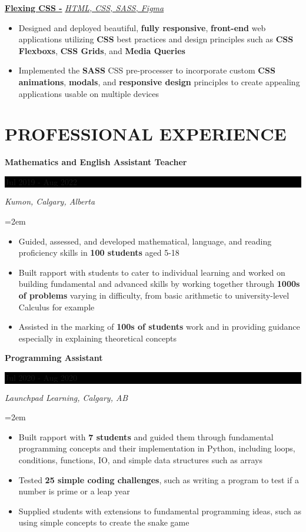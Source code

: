 \documentclass[10pt]{article}
\newcommand{\NewPart}[1]{\section*{\uppercase{#1}}}
\newcommand{\EducationEntry}[4]{
    \noindent \textbf{#1} \hfill      %
    \colorbox{Black}{
        \parbox{8.5em}{ \hfill\color{White}#2}} \par  %
    \noindent \textit{#3} \par        %
    \noindent\hangindent=2em\hangafter=0 \small #4 %
    \normalsize \par}
\newcommand{\WorkEntry}[4]{       %
    \noindent \textbf{#1} \hfill      %
    \colorbox{Black}{%
        \parbox{9em}{\hfill\color{White}#2}} %
    \par   %
    \noindent \textit{#3} \par        %
    \noindent\hangindent=2em\hangafter=0 \small #4 %
    \normalsize \par}
\newcommand{\ProjectEntry}[4]{         %
    \noindent \textbf{#1} \noindent \textit{#3} \hfill {#2} \par
    \noindent \small #4 %
    \normalsize \par}
\begin{document}
{\ProjectEntry
{\normalsize\href{https://github.com/nandanjp/Flexing-CSS/tree/main}
    {Flexing CSS -}}{}
{\normalsize\href{https://github.com/nandanjp/Flexing-CSS/tree/main}
    {HTML, CSS, SASS, Figma}}
{\begin{itemize} \itemsep -1pt
        \item Designed and deployed beautiful, \textbf{fully responsive}, \textbf{front-end}
              web applications utilizing \textbf{CSS} best practices and design principles
              such as \textbf{CSS Flexboxs}, \textbf{CSS Grids}, and \textbf{Media Queries}
        \item Implemented the \textbf{SASS} CSS pre-processer to incorporate custom
              \textbf{CSS animations}, \textbf{modals}, and \textbf{responsive design}
              principles to create appealing applications usable on multiple devices
    \end{itemize}
}

\NewPart{Professional Experience}{}
\WorkEntry
{Mathematics and English Assistant Teacher}
{Jul 2019 - Aug 2022}
{Kumon, Calgary, Alberta}
{\begin{itemize} \itemsep -1pt
        \item Guided, assessed, and developed mathematical, language, and reading proficiency
              skills in \textbf{100 students} aged 5-18
        \item Built rapport with students to cater to individual learning and worked on
              building fundamental and advanced skills by working together through
              \textbf{1000s of problems} varying in difficulty, from basic arithmetic to
              university-level Calculus for example
        \item Assisted in the marking of \textbf{100s of students} work and in providing
              guidance especially in explaining theoretical concepts
    \end{itemize}}

\WorkEntry
{Programming Assistant}
{Jul 2020 - Aug 2020}
{Launchpad Learning, Calgary, AB}
{\begin{itemize} \itemsep -1pt
        \item Built rapport with \textbf{7 students} and guided them through fundamental
              programming concepts and their implementation in Python, including loops,
              conditions, functions, IO, and simple data structures such as arrays
        \item Tested \textbf{25 simple coding challenges}, such as writing a program to test
              if a number is prime or a leap year
        \item Supplied students with extensions to fundamental programming ideas, such as
              using simple concepts to create the snake game
    \end{itemize}}

}
\end{document}

